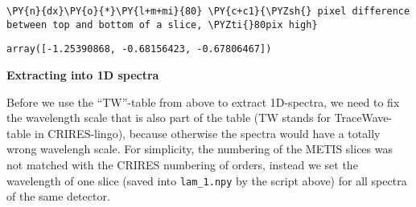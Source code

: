     \begin{tcolorbox}[breakable, size=fbox, boxrule=1pt, pad at break*=1mm,colback=cellbackground, colframe=cellborder]
\begin{Verbatim}[commandchars=\\\{\}]
\PY{n}{dx}\PY{o}{*}\PY{l+m+mi}{80} \PY{c+c1}{\PYZsh{} pixel difference between top and bottom of a slice, \PYZti{}80pix high}
\end{Verbatim}
\end{tcolorbox}

            \begin{tcolorbox}[breakable, size=fbox, boxrule=.5pt, pad at break*=1mm, opacityfill=0]
\begin{Verbatim}[commandchars=\\\{\}]
array([-1.25390868, -0.68156423, -0.67806467])
\end{Verbatim}
\end{tcolorbox}
        
    \textbf{Extracting into 1D spectra}

Before we use the ``TW''-table from above to extract 1D-spectra, we need
to fix the wavelength scale that is also part of the table (TW stands
for TraceWave-table in CRIRES-lingo), because otherwise the spectra
would have a totally wrong wavelengh scale. For simplicity, the
numbering of the METIS slices was not matched with the CRIRES numbering
of orders, instead we set the wavelength of one slice (saved into
\texttt{lam\_1.npy} by the script above) for all spectra of the same
detector.

